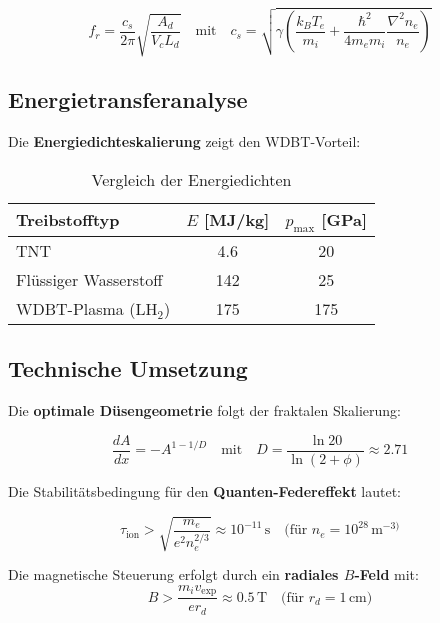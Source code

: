 \begin{equation}
f_r = \frac{c_s}{2\pi}\sqrt{\frac{A_d}{V_c L_d}} \quad \text{mit} \quad c_s = \sqrt{\gamma \left(\frac{k_B T_e}{m_i} + \frac{\hbar^2}{4m_e m_i}\frac{\nabla^2 n_e}{n_e}\right)}
\label{eq:resonanz}
\end{equation}

\subsection{Energietransferanalyse}
\label{subsec:energie}

Die \textbf{Energiedichteskalierung} zeigt den WDBT-Vorteil:

\begin{table}[h]
\centering
\caption{Vergleich der Energiedichten}
\label{tab:energie}
\begin{tabular}{lcc}
\toprule
Treibstofftyp & $E$ [MJ/kg] & $p_{\text{max}}$ [GPa] \\
\midrule
TNT & 4.6 & 20 \\
Flüssiger Wasserstoff & 142 & 25 \\
WDBT-Plasma (LH$_2$) & 175 & 175 \\
\bottomrule
\end{tabular}
\end{table}

\subsection{Technische Umsetzung}
\label{subsec:tech}

Die \textbf{optimale Düsengeometrie} folgt der fraktalen Skalierung:

\begin{equation}
\frac{dA}{dx} = -A^{1-1/D} \quad \text{mit} \quad D = \frac{\ln 20}{\ln(2+\phi)} \approx 2.71
\label{eq:duese}
\end{equation}

Die Stabilitätsbedingung für den \textbf{Quanten-Federeffekt} lautet:

\begin{equation}
\tau_{\text{ion}} > \sqrt{\frac{m_e}{e^2 n_e^{2/3}}} \approx 10^{-11}\,\text{s}\quad\text{(für }n_e=10^{28}\,\text{m}^{-3)}
\end{equation}

\begin{remark}
Die magnetische Steuerung erfolgt durch ein \textbf{radiales $B$-Feld} mit:
\[
B > \frac{m_i v_{\text{exp}}}{e r_d} \approx 0.5\,\text{T}\quad\text{(für }r_d=1\,\text{cm)}
\]
\end{remark}

